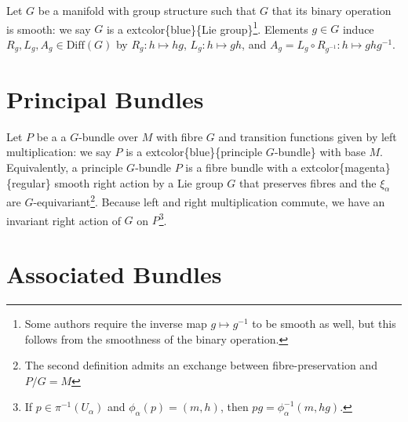 \documentclass[
]{book}
\begin{document}
Let \(G\) be a manifold with group structure such that \(G\) that its binary operation is smooth: we say \(G\) is a extcolor\{blue\}\{Lie group\}\footnote{Some authors require the inverse map \(g \mapsto g^{-1}\) to be smooth as well, but this follows from the smoothness of the binary operation.}.
Elements \(g \in G\) induce \(R_g, L_g, A_g \in \text{Diff}(G)\) by \(R_g : h \mapsto hg\), \(L_g : h \mapsto gh\), and \(A_g = L_g \circ R_{g^{-1}} : h \mapsto ghg^{-1}\).

\hypertarget{principal-bundles}{%
\section{Principal Bundles}\label{principal-bundles}}

Let \(P\) be a a \(G\)-bundle over \(M\) with fibre \(G\) and transition functions given by left multiplication: we say \(P\) is a extcolor\{blue\}\{principle \(G\)-bundle\} with base \(M\). Equivalently, a principle \(G\)-bundle \(P\) is a fibre bundle with a extcolor\{magenta\}\{regular\} smooth right action by a Lie group \(G\) that preserves fibres and the \(\xi_\alpha\) are \(G\)-equivariant\footnote{The second definition admits an exchange between fibre-preservation and \(P/G = M\)}.
Because left and right multiplication commute, we have an invariant right action of \(G\) on \(P\)\footnote{If \(p \in \pi^{-1}(U_\alpha)\) and \(\phi_\alpha(p) = (m,h)\), then \(pg = \phi_\alpha^{-1}(m,hg)\).}.

\hypertarget{associated-bundles}{%
\section{Associated Bundles}\label{associated-bundles}}
\end{document}
